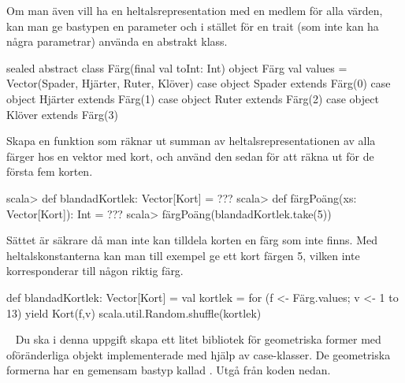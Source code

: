 \Subtask Om man även vill ha en heltalsrepresentation med en medlem  för alla värden, kan man ge bastypen en parameter och i stället för en trait (som inte kan ha några parametrar) använda en abstrakt klass.

\begin{Code}
sealed abstract class Färg(final val toInt: Int)
object Färg {
  val values = Vector(Spader, Hjärter, Ruter, Klöver)
}
case object Spader  extends Färg(0)
case object Hjärter extends Färg(1)
case object Ruter   extends Färg(2)
case object Klöver  extends Färg(3)
\end{Code}
Skapa en funktion  som räknar ut summan av heltalsrepresentationen av alla färger hos en vektor med kort, och använd den sedan för att räkna ut  för de första fem korten.
\begin{REPL}
scala> def blandadKortlek: Vector[Kort] = ???
scala> def färgPoäng(xs: Vector[Kort]): Int = ???
scala> färgPoäng(blandadKortlek.take(5))
\end{REPL}


\SOLUTION

\TaskSolved \what

\SubtaskSolved  Sättet är säkrare då man inte kan tilldela korten en färg som inte finns. Med heltalskonstanterna kan man till exempel ge ett kort färgen 5, vilken inte korresponderar till någon riktig färg.

\SubtaskSolved  {}

\SubtaskSolved
\begin{Code}
def blandadKortlek: Vector[Kort] = {
  val kortlek =
    for (f <- Färg.values; v <- 1 to 13) yield Kort(f,v)
  scala.util.Random.shuffle(kortlek)
}
\end{Code}

\SubtaskSolved  {}

\QUESTEND












\ExtraTasks %




\QUESTBEGIN

\Task  \what~  Du ska i denna uppgift skapa ett litet bibliotek för geometriska former med oföränderliga objekt implementerade med hjälp av case-klasser. De geometriska formerna har en gemensam bastyp kallad . Utgå från koden nedan.

